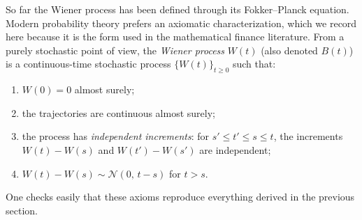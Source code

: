 So far the Wiener process has been defined through its Fokker--Planck equation.
Modern probability theory prefers an axiomatic characterization, which we record here because it is the form used in the mathematical finance literature.
From a purely stochastic point of view, the \emph{Wiener process} $W(t)$ (also denoted $B(t)$) is a continuous-time stochastic process $\{W(t)\}_{t\ge0}$ such that:
\begin{enumerate}[label=(\roman*)]
    \item $W(0)=0$ almost surely;
    \item the trajectories are continuous almost surely;
    \item the process has \emph{independent increments}: for $s'\le t'\le s\le t$, the increments $W(t)-W(s)$ and $W(t')-W(s')$ are independent;
    \item $W(t)-W(s)\sim\mathcal{N}(0,\,t-s)$ for $t>s$.
\end{enumerate}
One checks easily that these axioms reproduce everything derived in the previous section.

